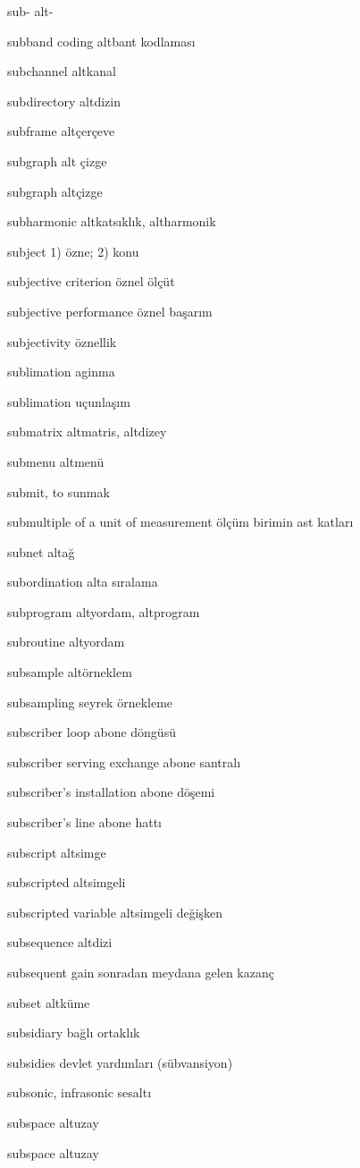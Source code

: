 \documentclass[12pt,fleqn]{article}\usepackage{../../common}
\begin{document}
sub- alt-

subband coding altbant kodlaması

subchannel altkanal

subdirectory altdizin

subframe altçerçeve

subgraph alt çizge

subgraph altçizge

subharmonic altkatsıklık, altharmonik

subject 1) özne; 2) konu

subjective criterion öznel ölçüt

subjective performance öznel başarım

subjectivity öznellik

sublimation aginma

sublimation uçunlaşım

submatrix altmatris, altdizey

submenu altmenü

submit, to sunmak

submultiple of a unit of measurement ölçüm birimin ast katları

subnet altağ

subordination alta sıralama

subprogram altyordam, altprogram

subroutine altyordam

subsample altörneklem

subsampling seyrek örnekleme

subscriber loop abone döngüsü

subscriber serving exchange abone santralı

subscriber's installation abone döşemi

subscriber's line abone hattı

subscript altsimge

subscripted altsimgeli

subscripted variable altsimgeli değişken

subsequence altdizi

subsequent gain sonradan meydana gelen kazanç

subset altküme

subsidiary bağlı ortaklık

subsidies devlet yardımları (sübvansiyon)

subsonic, infrasonic sesaltı

subspace altuzay

subspace altuzay
\end{document}
